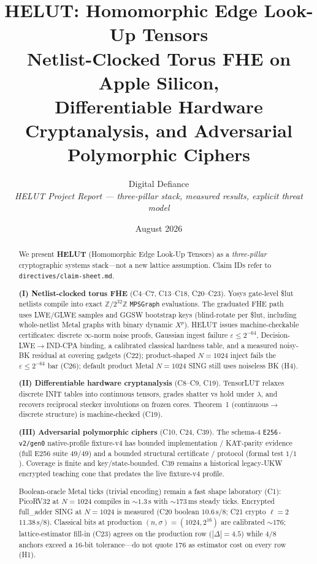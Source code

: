 \documentclass[11pt,a4paper]{article}
\title{\textbf{HELUT}: Homomorphic Edge Look-Up Tensors\\
\large Netlist-Clocked Torus FHE on Apple Silicon,\\
Differentiable Hardware Cryptanalysis, and Adversarial Polymorphic Ciphers}
\author{Digital Defiance\\
\textit{HELUT Project Report --- three-pillar stack, measured results, explicit threat model}}
\date{August 2026}
\begin{document}
\maketitle

\begin{abstract}
We present \textbf{HELUT} (Homomorphic Edge Look-Up Tensors) as a \emph{three-pillar}
cryptographic systems stack---not a new lattice assumption.
Claim IDs refer to \texttt{directives/claim-sheet.md}.

\textbf{(I) Netlist-clocked torus FHE} (C4--C7, C13--C18, C20--C23).
Yosys gate-level \$lut netlists compile into exact $\mathbb{Z}/2^{32}\mathbb{Z}$
\texttt{MPSGraph} evaluations. The graduated FHE path uses LWE/GLWE samples and
GGSW bootstrap keys (blind-rotate per \$lut, including whole-netlist Metal graphs
with binary dynamic $X^p$). HELUT issues machine-checkable certificates:
discrete $\infty$-norm noise proofs, Gaussian ingest failure $\varepsilon\le 2^{-64}$,
Decision-LWE$\to$IND-CPA binding, a calibrated classical hardness table, and a
measured noisy-BK residual at covering gadgets (C22); product-shaped $N{=}1024$
inject fails the $\varepsilon\le 2^{-64}$ bar (C26); default product Metal
$N{=}1024$ SING still uses noiseless BK (H4).

\textbf{(II) Differentiable hardware cryptanalysis} (C8--C9, C19).
TensorLUT relaxes discrete INIT tables into continuous tensors, grades shatter vs
hold under $\lambda$, and recovers reciprocal stecker involutions on frozen cores.
Theorem~1 (continuous$\to$discrete structure) is machine-checked (C19).

\textbf{(III) Adversarial polymorphic ciphers} (C10, C24, C39).
The schema-4 \texttt{E256-v2/gen0} native-profile fixture-v4 has bounded
implementation / KAT-parity evidence (full E256 suite $49/49$) and a bounded
structural certificate / protocol (formal test $1/1$). Coverage is finite and
key/state-bounded. C39 remains a historical legacy-UKW encrypted teaching cone
that predates the live fixture-v4 profile.

Boolean-oracle Metal ticks (trivial encoding) remain a fast shape laboratory
(C1): PicoRV32 at $N{=}1024$ compiles in ${\sim}1.3\,\mathrm{s}$ with
${\sim}173\,\mathrm{ms}$ steady ticks. Encrypted full\_adder SING at $N{=}1024$
is measured (C20 boolean $10.6\,\mathrm{s}/8$; C21 crypto $\ell{=}2$
$11.38\,\mathrm{s}/8$). Classical bits at production $(n,\sigma)=(1024,2^{16})$
are calibrated ${\sim}176$; lattice-estimator fill-in (C23) agrees on the
production row ($|\Delta|{=}4.5$) while $4/8$ anchors exceed a $16$-bit
tolerance---do not quote $176$ as estimator cost on every row (H1).
\end{abstract}
\end{document}
